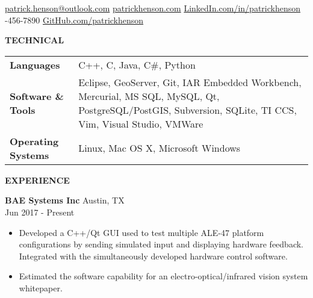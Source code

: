 \documentclass[10pt]{article}
\newcommand{\verticalspace}{\vspace{2.0mm}}
\newcommand{\horizontalrule}{\noindent\hrulefill}
\newcommand{\heading}{\noindent\Large\bf} %
\newcommand{\headingspace}{\vspace{3.5mm}}
\begin{document}
\renewcommand\familydefault{\sfdefault}



\hfill

\vspace{-2mm}
\horizontalrule

\noindent 
\href{mailto:fullname@email.com}{patrick.henson@outlook.com}
\hfill
\href{https://patrickhenson.com}{patrickhenson.com}
\hfill
\href{linkedin.com/in/patrickhenson}{LinkedIn.com/in/patrickhenson}
\\
-456-7890
\hfill
\href{https://github.com/PatrickHenson}{GitHub.com/patrickhenson}

\headingspace
{\heading TECHNICAL}

\verticalspace

\begin{tabular}{@{} p{.2\linewidth} p{.75\linewidth}}

{\bf Languages} & C++, C, Java, C\#, Python \\

{\bf Software \& Tools} & Eclipse, GeoServer, Git, IAR Embedded Workbench, Mercurial, MS SQL, MySQL, Qt, PostgreSQL/PostGIS, Subversion, SQLite, TI CCS, Vim, Visual Studio, VMWare \\

{\bf Operating Systems} & Linux, Mac OS X, Microsoft Windows

\end{tabular}

{\heading EXPERIENCE}

\verticalspace

{\bf BAE Systems Inc} \hfill Austin, TX \\
 \hfill Jun 2017 - Present
\begin{itemize}
\item Developed a C++/Qt GUI used to test multiple ALE-47 platform configurations by sending simulated input and displaying hardware feedback.  Integrated with the simultaneously developed hardware control software.
\item Estimated the software capability for an electro-optical/infrared vision system whitepaper.
\end{itemize}
\end{document}
